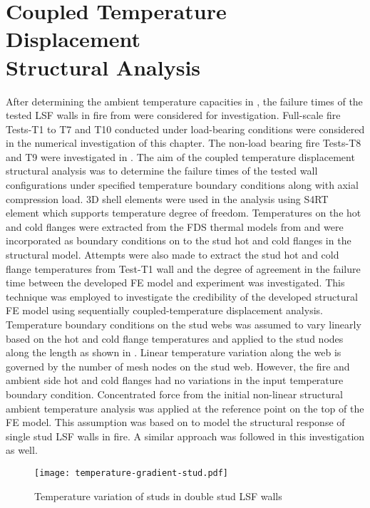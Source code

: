 \section[Coupled Temperature Displacement Structural Analysis]{Coupled Temperature Displacement \\Structural Analysis}\label{sec:temp-disp-structural}

After determining the ambient temperature capacities in , the failure times of the tested LSF walls in fire from  were considered for investigation. Full-scale fire Tests-T1 to T7 and T10 conducted under load-bearing conditions were considered in the numerical investigation of this chapter. The non-load bearing fire Tests-T8 and T9 were investigated in . The aim of the coupled temperature displacement structural analysis was to determine the failure times of the tested wall configurations under specified temperature boundary conditions along with axial compression load. 3D shell elements were used in the analysis using S4RT element which supports temperature degree of freedom. Temperatures on the hot and cold flanges were extracted from the FDS thermal models from  and were incorporated as boundary conditions on to the stud hot and cold flanges in the structural model. Attempts were also made to extract the stud hot and cold flange temperatures from Test-T1 wall and the degree of agreement in the failure time between the developed FE model and experiment was investigated. This technique was employed to investigate the credibility of the developed structural FE model using sequentially coupled-temperature displacement analysis. Temperature boundary conditions on the stud webs was assumed to vary linearly based on the hot and cold flange temperatures and applied to the stud nodes along the length as shown in . Linear temperature variation along the web is governed by the number of mesh nodes on the stud web. However, the fire and ambient side hot and cold flanges had no variations in the input temperature boundary condition. Concentrated force from the initial non-linear structural ambient temperature analysis was applied at the reference point on the top of the FE model. This assumption was based on \citet{Ariyanayagam2018b} to model the structural response of single stud LSF walls in fire. A similar approach was followed in this investigation as well.  
\begin{figure}[!htbp]
	\centering
			\texttt{[image: temperature-gradient-stud.pdf]}\\
		\caption{Temperature variation of studs in double stud LSF walls}
		\label{fig:temperature-gradient-stud}
\end{figure}
